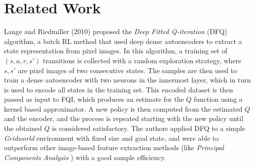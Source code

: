 \section{Related Work}
Lange and Riedmiller (2010) \cite{lange2010deep} proposed the \textit{Deep 
Fitted Q-iteration} (DFQ) algorithm, a batch RL method that used deep dense 
autoencoders to extract a state representation from pixel images. 
In this algorithm, a training set of $(s, a, r, s')$ transitions is collected
with a random exploration strategy, where $s, s'$ are pixel images of two 
consecutive states. The samples are then used to train a dense autoencoder with 
two neurons in the innermost layer, which in turn is used to encode all states 
in the training set. This encoded dataset is then passed as input to FQI, 
which produces an estimate for the $Q$ function using a kernel based 
approximator. A new policy is then computed from the estimated $Q$ and the 
encoder, and the process is repeated starting with the new policy until the 
obtained $Q$ is considered satisfactory.
The authors applied DFQ to a simple \textit{Gridworld} environment with fixed 
size and goal state, and were able to outperform other image-based feature
extraction methods (like \textit{Principal Components Analysis} 
\cite{wold1987principal}) with a good sample efficiency.


























